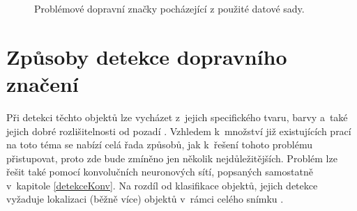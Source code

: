 \begin{figure}[H]
    \caption{Problémové dopravní značky pocházející z použité datové sady.}
    \label{fig:kolazZnacky}
\end{figure}


\section{Způsoby detekce dopravního značení}
\label{zpusobyDetekce}
Při detekci těchto objektů lze vycházet z~jejich specifického tvaru, barvy a~také jejich dobré rozlišitelnosti od pozadí \cite{tsDetectOverview}. Vzhledem k~množství již existujících prací na toto téma se nabízí celá řada způsobů, jak k~řešení tohoto problému přistupovat, proto zde bude zmíněno jen několik nejdůležitějších. Problém lze řešit také pomocí konvolučních neuronových sítí, popsaných samostatně v~kapitole \ref{detekceKonv}. Na rozdíl od klasifikace objektů, jejich detekce vyžaduje lokalizaci (běžně více) objektů v~rámci celého snímku \cite{rcnn}.


